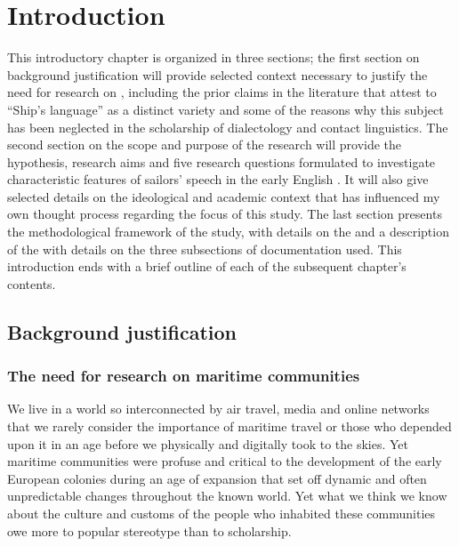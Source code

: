 \chapter{Introduction}

This introductory chapter is organized in three sections; the first section on background justification will provide selected context necessary to justify the need for research on , including the prior claims in the literature that attest to “Ship’s language” as a distinct variety and some of the reasons why this subject has been neglected in the scholarship of dialectology and contact linguistics. The second section on the scope and purpose of the research will provide the hypothesis, research aims and five research questions formulated to investigate characteristic features of sailors’ speech in the early English . It will also give selected details on the ideological and academic context that has influenced my own thought process regarding the focus of this study. The last section presents the methodological framework of the study, with details on the  and a description of the  with details on the three subsections of documentation used. This introduction ends with a brief outline of each of the subsequent chapter’s contents.



\section{{Background justification} }\label{sec:1.1}



\subsection{{The need for research on maritime communities}}\label{sec:1.1.1}



We live in a world so interconnected by air travel, media and online networks that we rarely consider the importance of maritime travel or those who depended upon it in an age before we physically and digitally took to the skies. Yet maritime communities were profuse and critical to the development of the early European colonies during an age of expansion that set off dynamic and often unpredictable changes throughout the known world. Yet what we think we know about the culture and customs of the people who inhabited these communities owe more to popular stereotype than to scholarship. 



